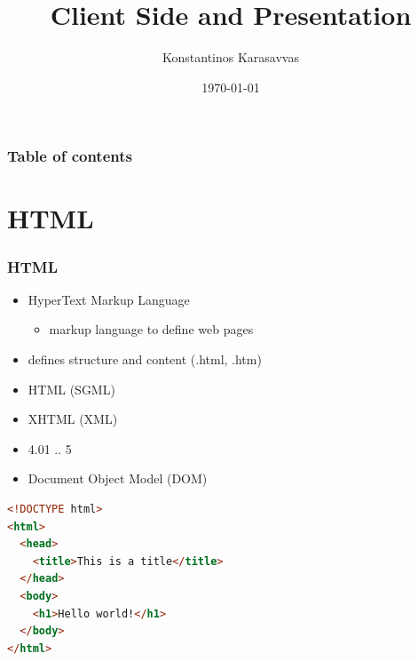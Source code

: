 \documentclass{beamer}
\begin{document}
\title{Client Side and Presentation}
\author[Konstantinos Karasavvas]{Konstantinos Karasavvas} %

\date{\today} 

\begin{frame}
  \titlepage
\end{frame}

\begin{frame}
\setcounter{tocdepth}{1}
\frametitle{Table of contents}
\tableofcontents
\end{frame} 





\section{HTML} 
\begin{frame}[fragile]\frametitle{HTML} 

  \begin{itemize}
    \item HyperText Markup Language
    \begin{itemize}
      \item markup language to define web pages
    \end{itemize}
    \item defines structure and content (.html, .htm)
    \item HTML (SGML)
    \item XHTML (XML)
    \item 4.01 .. 5
    \item Document Object Model (DOM)
  \end{itemize}

  \begin{lstlisting}[language=html, escapechar={^}]
<!DOCTYPE html>
<html>
  <head>
    <title>This is a title</title>
  </head>
  <body>
    <h1>Hello world!</h1>
  </body>
</html>
  \end{lstlisting}
  
\end{frame}
\end{document}
